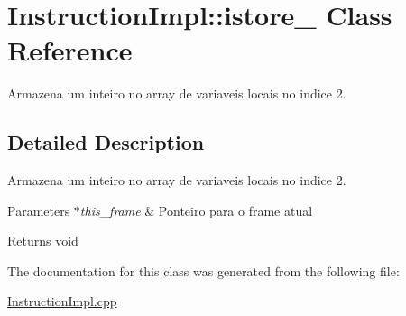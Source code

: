\hypertarget{class_instruction_impl_1_1istore__2}{}\section{Instruction\+Impl\+:\+:istore\+\_ Class Reference}
\label{class_instruction_impl_1_1istore__2}


Armazena um inteiro no array de variaveis locais no indice 2.  




\subsection{Detailed Description}
Armazena um inteiro no array de variaveis locais no indice 2. 


\begin{DoxyParams}{Parameters}
{\em $\ast$this\+\_\+frame} & Ponteiro para o frame atual \\
\hline
\end{DoxyParams}
\begin{DoxyReturn}{Returns}
void 
\end{DoxyReturn}


The documentation for this class was generated from the following file\+:\begin{DoxyCompactItemize}
\item 
\hyperlink{_instruction_impl_8cpp}{Instruction\+Impl.\+cpp}\end{DoxyCompactItemize}
